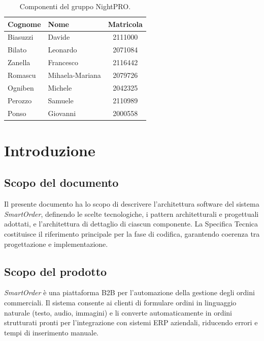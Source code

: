 \documentclass[a4paper, 11pt, oneside]{scrartcl}
\begin{document}
\begin{table}[H]
    \centering
    \renewcommand{\arraystretch}{1.2}
    \begin{tabular}{@{}llc@{}}
        \toprule
        \textbf{Cognome} & \textbf{Nome}   & \textbf{Matricola} \\
        \midrule
        Biasuzzi         & Davide          & 2111000            \\
        Bilato           & Leonardo        & 2071084            \\
        Zanella          & Francesco       & 2116442            \\
        Romascu          & Mihaela-Mariana & 2079726            \\
        Ogniben          & Michele         & 2042325            \\
        Perozzo          & Samuele         & 2110989            \\
        Ponso            & Giovanni        & 2000558            \\
        \bottomrule
    \end{tabular}
    \caption{Componenti del gruppo NightPRO.}
\end{table}

\newpage
\section{Introduzione}

\subsection{Scopo del documento}
Il presente documento ha lo scopo di descrivere l'architettura software del sistema \textit{SmartOrder}, definendo le scelte tecnologiche, i pattern architetturali e progettuali adottati, e l'architettura di dettaglio di ciascun componente.
La Specifica Tecnica costituisce il riferimento principale per la fase di codifica, garantendo coerenza tra progettazione e implementazione.

\subsection{Scopo del prodotto}
\textit{SmartOrder} \`e una piattaforma B2B per l'automazione della gestione degli ordini commerciali. Il sistema consente ai clienti di formulare ordini in linguaggio naturale (testo, audio, immagini) e li converte automaticamente in ordini strutturati pronti per l'integrazione con sistemi ERP aziendali, riducendo errori e tempi di inserimento manuale.
\end{document}
